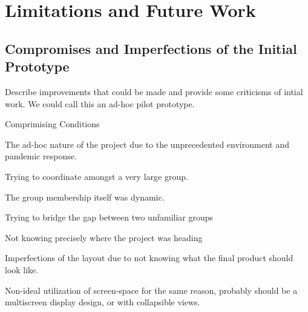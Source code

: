 \section{Limitations and Future Work}

\subsection{Compromises and Imperfections of the Initial Prototype}

Describe improvements that could be made and provide some criticisms of intial work.  We could call this an ad-hoc pilot prototype.

Comprimising Conditions

The ad-hoc nature of the project due to the unprecedented environment and pandemic response.

Trying to coordinate amongst a very large group.

The group membership itself was dynamic.

Trying to bridge the gap between two unfamiliar groups

Not knowing precisely where the project was heading

Imperfections of the layout due to not knowing what the final product should look like.

Non-ideal utilization of screen-space for the same reason, probably should be a multiscreen display design, or with collapsible views.
